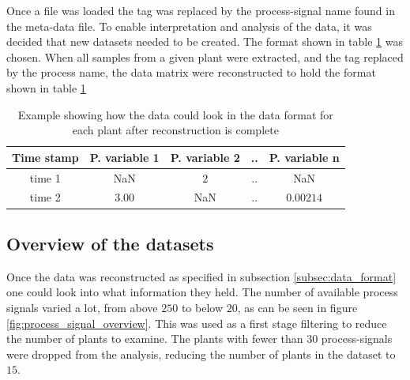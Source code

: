         Once a file was loaded the tag was replaced by the process-signal name found in the meta-data file. To enable interpretation and analysis of the data, it was decided that new datasets needed to be created. The format shown in table \ref{tab:plant_format} was chosen. When all samples from a given plant were extracted, and the tag replaced by the process name, the data matrix were reconstructed to hold the format shown in table \ref{tab:plant_format}
        
        \begin{table}[h]
            \centering
            \begin{tabular}{|c|c|c|c|c|}
                \hline
                Time stamp & P. variable 1     & P. variable 2    & ..    & P. variable n    \\ \hline
                time 1        & NaN         & $2$           & ..    & NaN         \\ \hline
                time 2        & $3.00$      & NaN           & ..    & $0.00214$\\ \hline
            \end{tabular}
            \caption{Example showing how the data could look in the data format for each plant after reconstruction is complete}
            \label{tab:plant_format}
        \end{table}

        
    \subsection{Overview of the datasets}
        Once the data was reconstructed as specified in subsection \ref{subsec:data_format} one could look into what information they held. The number of available process signals varied a lot, from above $250$ to below $20$, as can be seen in figure \ref{fig:process_signal_overview}. This was used as a first stage filtering to reduce the number of plants to examine. The plants with fewer than $30$ process-signals were dropped from the analysis, reducing the number of plants in the dataset to $15$.    
        
